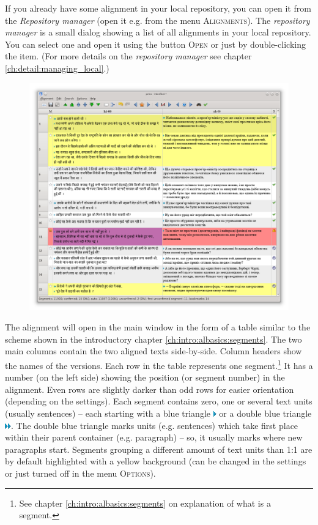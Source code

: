 \documentclass[a4paper,10pt,oneside]{book}
\newcommand{\menu}[1]{\textsc{#1}}
\begin{document}
If you already have some alignment in your local repository, you can open it from the \emph{Repository manager} (open it e.g. from the menu \menu{Alignments}). The \emph{repository manager} is a small dialog showing a list of all alignments in your local repository. You can select one and open it using the button \menu{Open} or just by double-clicking the item. (For more details on the \emph{repository manager} see chapter \ref{ch:detail:managing_local}.)

\begin{figure}[htb]
 \includegraphics[width=\textwidth]{screenshots/mainwindow.png}
\end{figure}


The alignment will open in the main window in the form of a table similar to the scheme shown in the introductory chapter \ref{ch:intro:albasics:segments}. The two main columns contain the two aligned texts side-by-side. Column headers show the names of the versions. Each row in the table represents one segment.\footnote{See chapter \ref{ch:intro:albasics:segments} on explanation of what is a segment.} It has a number (on the left side) showing the position (or segment number) in the alignment. Even rows are slightly darker than odd rows for easier orientation (depending on the settings). Each segment contains zero, one or several text units (usually sentences) -- each starting with a blue triangle \includegraphics[height=1ex]{../images/16/arrow.png} or a double blue triangle \includegraphics[height=1ex]{../images/16/dblarrow.png}. The double blue triangle marks units (e.g. sentences) which take first place within their parent container (e.g. paragraph) -- so, it usually marks where new paragraphs start. Segments grouping a different amount of text units than 1:1 are by default highlighted with a yellow background (can be changed in the settings or just turned off in the menu \menu{Options}).
\end{document}

